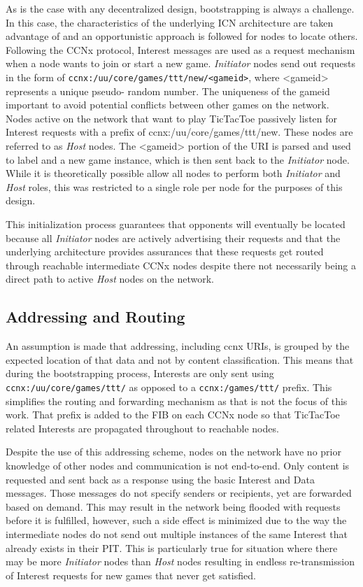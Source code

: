\documentclass[a4paper,12pt]{report}      %
\begin{document}
As is the case with any decentralized design, bootstrapping is always a challenge. In this case, the
characteristics of the underlying ICN architecture are taken advantage of and an opportunistic approach
is followed for nodes to locate others. Following the CCNx protocol, Interest messages are used as a
request mechanism when a node wants to join or start a new game. \emph{Initiator} nodes send out requests in
the form of \verb!ccnx:/uu/core/games/ttt/new/<gameid>!, where <gameid> represents a unique pseudo-
random number. The uniqueness of the gameid important to avoid potential conflicts between other
games on the network. Nodes active on the network that want to play TicTacToe passively listen for
Interest requests with a prefix of ccnx:/uu/core/games/ttt/new. These nodes are referred to as \emph{Host}
nodes. The <gameid> portion of the URI is parsed and used to label and a new game instance, which is
then sent back to the \emph{Initiator} node. While it is theoretically possible allow 
all nodes to perform both \emph{Initiator} and \emph{Host} roles, this was restricted to a single role per node for
the purposes of this design.

This initialization process guarantees that opponents will eventually be located because all \emph{Initiator}
nodes are actively advertising their requests and that the underlying architecture provides assurances
that these requests get routed through reachable intermediate CCNx nodes despite there not necessarily
being a direct path to active \emph{Host} nodes on the network.

\subsection{Addressing and Routing}

An assumption is made that addressing, including ccnx URIs, is grouped by the expected location of
that data and not by content classification. This means that during the bootstrapping process, Interests
are only sent using \verb!ccnx:/uu/core/games/ttt/! as opposed to a \verb!ccnx:/games/ttt/! prefix. This simplifies the
routing and forwarding mechanism as that is not the focus of this work. That prefix is added to the FIB
on each CCNx node so that TicTacToe related Interests are propagated throughout to reachable nodes.

Despite the use of this addressing scheme, nodes on the network have no prior knowledge of other
nodes and communication is not end-to-end. Only content is requested and sent back
as a response using the basic Interest and Data messages. Those messages do not specify senders or
recipients, yet are forwarded based on demand. This may result in the network being flooded with
requests before it is fulfilled, however, such a side effect is minimized due to the way the intermediate
nodes do not send out multiple instances of the same Interest that already exists in their PIT. This is
particularly true for situation where there may be more \emph{Initiator} nodes than \emph{Host} nodes resulting in
endless re-transmission of Interest requests for new games that never get satisfied.
\end{document}
